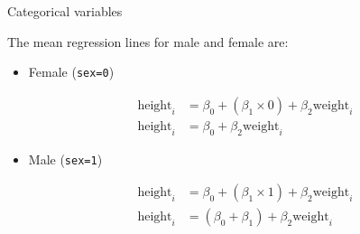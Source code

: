\documentclass[pdf]{beamer}
\begin{document}
\begin{frame}{Categorical variables}

The mean regression lines for male and female are:

\begin{itemize}\addtolength{\itemsep}{2\baselineskip}

\item Female (\texttt{sex=0})

$$
\begin{aligned}
    \mathrm{height}_i & = \beta_0 + (\beta_1 \times 0) + \beta_2\mathrm{weight}_i\\
    \mathrm{height}_i & = \beta_0 + \beta_2\mathrm{weight}_i
\end{aligned}
$$

\item Male (\texttt{sex=1})

$$
\begin{aligned}
    \mathrm{height}_i & = \beta_0 + (\beta_1 \times 1) + \beta_2\mathrm{weight}_i\\
    \mathrm{height}_i & = (\beta_0 + \beta_1) + \beta_2\mathrm{weight}_i
\end{aligned}
$$

\end{itemize}

\end{frame}

\end{document}
